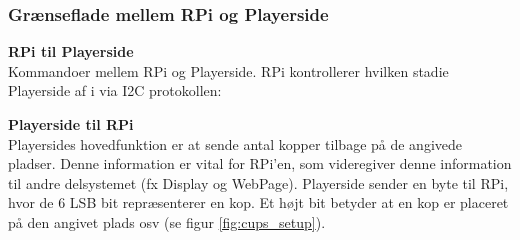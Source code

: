 \documentclass[Arkitektur/System_main.tex]{subfiles}
\begin{document}
\subsubsection{Grænseflade mellem RPi og Playerside}

\textbf{RPi til Playerside}
\\Kommandoer mellem RPi og Playerside. RPi kontrollerer hvilken stadie Playerside af i via I2C protokollen: 
\begin{table}[H]
\end{table}

\textbf{Playerside til RPi}
\\Playersides hovedfunktion er at sende antal kopper tilbage på de angivede pladser. Denne information er vital for RPi'en, som videregiver denne information til andre delsystemet (fx Display og WebPage). 
Playerside sender en byte til RPi, hvor de 6 LSB bit repræsenterer en kop. Et højt bit betyder at en kop er placeret på den angivet plads osv (se figur \ref{fig:cups_setup}). 
\begin{table}[H]
\end{table}
\end{document}
